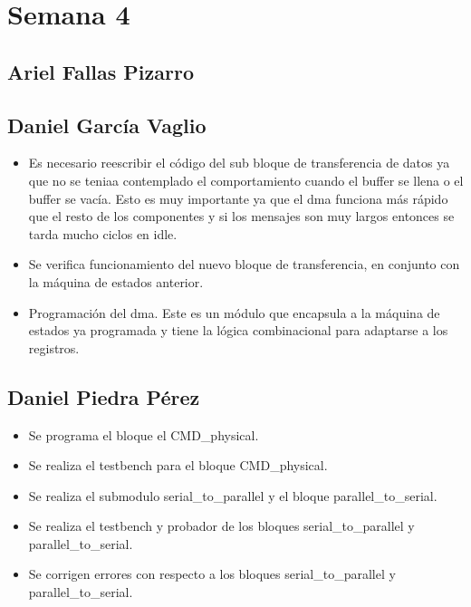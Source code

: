 \section{Semana 4}
\subsection{Ariel Fallas Pizarro}


\subsection{Daniel García Vaglio}
\begin{itemize}
\item Es necesario reescribir el código del sub bloque de transferencia de datos ya que no se teniaa
  contemplado el comportamiento cuando el buffer se llena o el buffer se vacía. Esto es muy
  importante ya que el dma funciona más rápido que el resto de los componentes y si los mensajes son
  muy largos entonces se tarda mucho ciclos en idle. 
\item Se verifica funcionamiento del nuevo bloque de transferencia, en conjunto con la máquina de
  estados anterior. 
\item Programación del dma. Este es un módulo que encapsula a la máquina de estados ya programada y
  tiene la lógica combinacional para adaptarse a los registros. 
\end{itemize}
\subsection{Daniel Piedra Pérez}
\begin{itemize}
\item Se programa el bloque el CMD\_physical.
\item Se realiza el testbench para el bloque CMD\_physical.
\item Se realiza el submodulo serial\_to\_parallel y el bloque parallel\_to\_serial.
\item Se realiza el testbench y probador de los bloques serial\_to\_parallel y parallel\_to\_serial.
\item Se corrigen errores con respecto a los bloques serial\_to\_parallel y parallel\_to\_serial.

\end{itemize}

